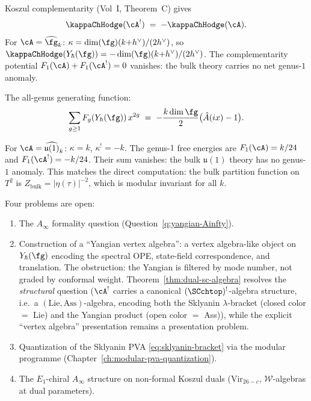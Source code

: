 Koszul complementarity (Vol~I, Theorem~C) gives
\begin{equation}%
\kappaChHodge(\cA^!)
\;=\;
-\kappaChHodge(\cA).
\end{equation}
For $\cA = \widehat{\fg}_k$: $\kappa = \dim(\fg)(k{+}h^\vee)/(2h^\vee)$, so
$\kappaChHodge(Y_\hbar(\fg)) = -\dim(\fg)(k{+}h^\vee)/(2h^\vee)$. The complementarity
potential $F_1(\cA) + F_1(\cA^!) = 0$ vanishes: the bulk
theory carries no net genus-$1$ anomaly.

The all-genus generating function:
\[
\sum_{g \ge 1} F_g(Y_\hbar(\fg))\,x^{2g}
\;=\;
-\frac{k\dim\fg}{2}\bigl(\hat{A}(ix) - 1\bigr).
\]

\begin{computation}
For $\cA = \widehat{\mathfrak{u}(1)}_k$:
$\kappa = k$, $\kappa^! = -k$. The genus-$1$ free energies
are $F_1(\cA) = k/24$ and $F_1(\cA^!) = -k/24$. Their sum
vanishes: the bulk $\mathfrak{u}(1)$ theory has no
genus-$1$ anomaly. This matches the direct computation:
the bulk partition function on $T^2$ is
$Z_{\mathrm{bulk}} = |\eta(\tau)|^{-2}$, which is modular
invariant for all $k$.
\end{computation}

\begin{remark}
Four problems are open:
\begin{enumerate}[label=\textup{(\roman*)}]
\item The $A_\infty$ formality question
 (Question~\ref{q:yangian-Ainfty}).
\item Construction of a ``Yangian vertex algebra'': a vertex
 algebra-like object on $Y_\hbar(\fg)$ encoding the spectral
 OPE, state-field correspondence, and translation. The
 obstruction: the Yangian is filtered by mode number, not
 graded by conformal weight. Theorem~\ref{thm:dual-sc-algebra}
 resolves the \emph{structural} question ($\cA^!$ carries a
 canonical $(\SCchtop)^{!}$-algebra structure, i.e.\ a $(\mathrm{Lie},\mathrm{Ass})$-algebra,
 encoding both the
 Sklyanin $\lambda$-bracket (closed color $=$ Lie) and the Yangian
 product (open color $=$ Ass)), while the explicit ``vertex algebra''
 presentation remains a presentation problem.
\item Quantization of the Sklyanin PVA
 \eqref{eq:sklyanin-bracket} via the modular programme
 (Chapter~\ref{ch:modular-pva-quantization}).
\item The $E_1$-chiral $A_\infty$ structure on
 non-formal Koszul duals ($\mathrm{Vir}_{26-c}$,
 $\mathcal{W}$-algebras at dual parameters).
\end{enumerate}
\end{remark}



